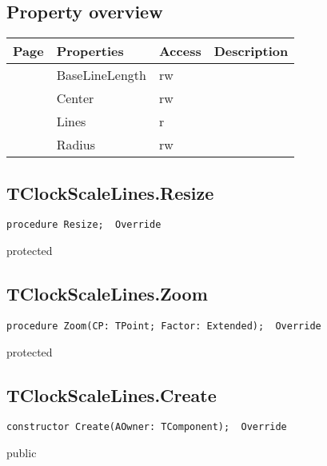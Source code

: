 \subsection{Property overview}
\label{hmi:retroclock:tclockscalelines:properties}
\begin{tabularx}{\textwidth}{lllX}
Page & Properties & Access & Description \\ \hline
\pageref{hmi:retroclock:tclockscalelines:baselinelength} & BaseLineLength & rw &  \\
\pageref{hmi:retroclock:tclockscalelines:center} & Center & rw &  \\
\pageref{hmi:retroclock:tclockscalelines:lines} & Lines & r &  \\
\pageref{hmi:retroclock:tclockscalelines:radius} & Radius & rw &  \\
\hline
\end{tabularx}
\subsection{TClockScaleLines.Resize}
\label{hmi:retroclock:tclockscalelines:resize}
\begin{FPCList}
\Declaration 

\begin{verbatim}
procedure Resize;  Override
\end{verbatim}
\Visibility
protected
\end{FPCList}
\subsection{TClockScaleLines.Zoom}
\label{hmi:retroclock:tclockscalelines:zoom}
\begin{FPCList}
\Declaration 

\begin{verbatim}
procedure Zoom(CP: TPoint; Factor: Extended);  Override
\end{verbatim}
\Visibility
protected
\end{FPCList}
\subsection{TClockScaleLines.Create}
\label{hmi:retroclock:tclockscalelines:create}
\begin{FPCList}
\Declaration 

\begin{verbatim}
constructor Create(AOwner: TComponent);  Override
\end{verbatim}
\Visibility
public
\end{FPCList}
